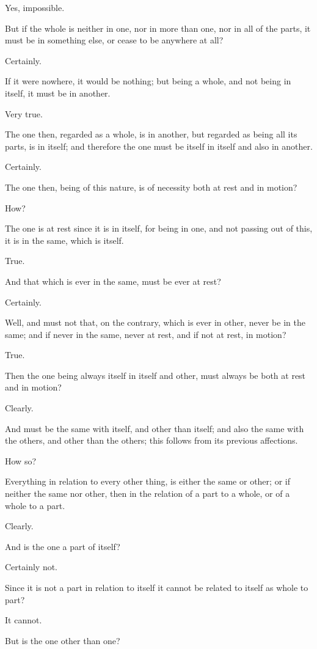 Yes, impossible.

But if the whole is neither in one, nor in more than one, nor in all of
the parts, it must be in something else, or cease to be anywhere at all?

Certainly.

If it were nowhere, it would be nothing; but being a whole, and not
being in itself, it must be in another.

Very true.

The one then, regarded as a whole, is in another, but regarded as being
all its parts, is in itself; and therefore the one must be itself in
itself and also in another.

Certainly.

The one then, being of this nature, is of necessity both at rest and in
motion?

How?

The one is at rest since it is in itself, for being in one, and not
passing out of this, it is in the same, which is itself.

True.

And that which is ever in the same, must be ever at rest?

Certainly.

Well, and must not that, on the contrary, which is ever in other, never
be in the same; and if never in the same, never at rest, and if not at
rest, in motion?

True.

Then the one being always itself in itself and other, must always be
both at rest and in motion?

Clearly.

And must be the same with itself, and other than itself; and also the
same with the others, and other than the others; this follows from its
previous affections.

How so?

Everything in relation to every other thing, is either the same or
other; or if neither the same nor other, then in the relation of a part
to a whole, or of a whole to a part.

Clearly.

And is the one a part of itself?

Certainly not.

Since it is not a part in relation to itself it cannot be related to
itself as whole to part?

It cannot.

But is the one other than one?


